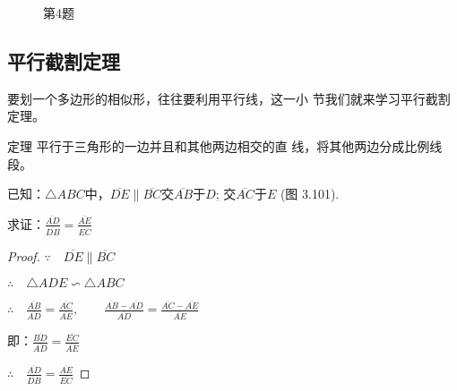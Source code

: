 \begin{figure}[htp]
    \centering
{}
    \caption*{第4题}
\end{figure}

\subsection{平行截割定理}
要划一个多边形的相似形，往往要利用平行线，这一小
节我们就来学习平行截割定理。

\begin{blk}
    {定理} 平行于三角形的一边并且和其他两边相交的直
线，将其他两边分成比例线段。
\end{blk}

已知：$\triangle ABC$中，$\overline{DE}\parallel \overline{BC}$交$\overline{AB}$于$D$; 交$\overline{AC}$于$E$ (图
3.101).

求证：$\frac{\overline{AD}}{\overline{DB}}=\frac{\overline{AE}}{\overline{EC}}$

\begin{proof}
$\because\quad  \overline{DE}\parallel \overline{BC}$

$\therefore\quad \triangle ADE\backsim \triangle ABC$

$\therefore\quad \frac{\overline{AB}}{\overline{AD}}=\frac{\overline{AC}}{\overline{AE}},\qquad \frac{\overline{AB}-\overline{AD}}{\overline{AD}}=\frac{\overline{AC}-\overline{AE}}{\overline{AE}}$

即：$\frac{\overline{BD}}{\overline{AD}}=\frac{\overline{EC}}{\overline{AE}}$

$\therefore\quad \frac{\overline{AD}}{\overline{DB}}=\frac{\overline{AE}}{\overline{EC}}$
\end{proof}

